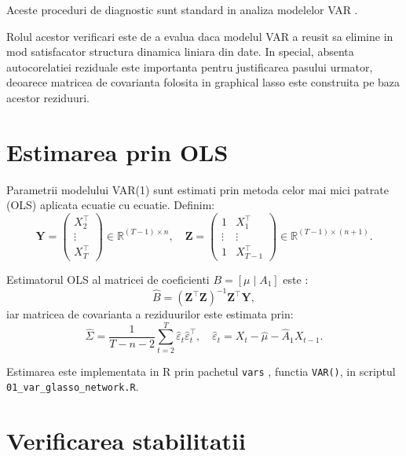 Aceste proceduri de diagnostic sunt standard in analiza modelelor VAR
\citep{lutkepohl2005,tsay2010}.

Rolul acestor verificari este de a evalua daca modelul VAR a reusit sa elimine
in mod satisfacator structura dinamica liniara din date. In special, absenta
autocorelatiei reziduale este importanta pentru justificarea pasului urmator,
deoarece matricea de covarianta folosita in graphical lasso este construita pe
baza acestor reziduuri.

\section{Estimarea prin OLS}

Parametrii modelului VAR(1) sunt estimati prin metoda celor mai mici patrate
(OLS) aplicata ecuatie cu ecuatie. Definim:
\[
    \mathbf{Y} = \begin{pmatrix} X_{2}^\top \\ \vdots \\ X_{T}^\top \end{pmatrix}
    \in \mathbb{R}^{(T-1) \times n}, \quad
    \mathbf{Z} = \begin{pmatrix} 1 & X_{1}^\top \\ \vdots & \vdots \\ 1 & X_{T-1}^\top \end{pmatrix}
    \in \mathbb{R}^{(T-1) \times (n+1)}.
\]

Estimatorul OLS al matricei de coeficienti $B = [\mu \mid A_1]$ este
\citep{lutkepohl2005}:
\begin{equation}
    \hat{B} = (\mathbf{Z}^\top \mathbf{Z})^{-1} \mathbf{Z}^\top \mathbf{Y},
    \label{eq:ols_var}
\end{equation}
iar matricea de covarianta a reziduurilor este estimata prin:
\begin{equation}
    \hat{\Sigma} = \frac{1}{T - n - 2} \sum_{t=2}^{T}
    \hat{\varepsilon}_t \hat{\varepsilon}_t^\top, \quad
    \hat{\varepsilon}_t = X_t - \hat{\mu} - \hat{A}_1 X_{t-1}.
    \label{eq:sigma_hat}
\end{equation}

Estimarea este implementata in R prin pachetul \texttt{vars} \citep{pfaff2008},
functia \texttt{VAR()}, in scriptul \texttt{01\_var\_glasso\_network.R}.

\section{Verificarea stabilitatii}

